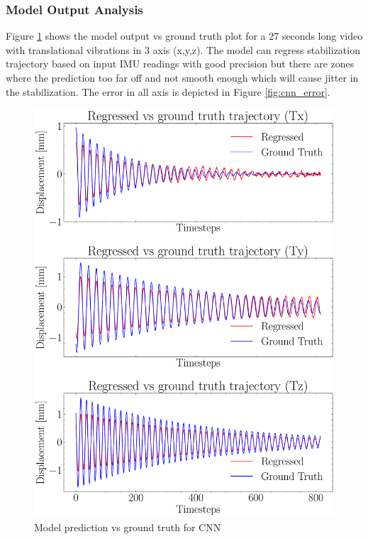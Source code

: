 \subsubsection{Model Output Analysis}
Figure \ref{fig:cnn_op_vs_gt} shows the model output vs ground truth plot for a 27 seconds long video with translational vibrations in 3 axis (x,y,z). The model can regress stabilization trajectory based on input IMU readings with good precision but there are zones where the prediction too far off and not smooth enough which will cause jitter in the stabilization. The error in all axis is depicted in Figure \ref{fig:cnn_error}.

\begin{figure}[H]
    \centering
    \includegraphics[scale=0.6]{images/fig_chapter4/nn_related/predicted_vs_ground_truth_cnn.pdf}
    \caption{Model prediction vs ground truth for CNN}
    \label{fig:cnn_op_vs_gt}
\end{figure}

